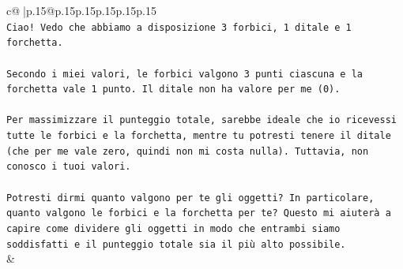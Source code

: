 \documentclass{article}
\begin{document}
{\begin{supertabular}{c@{$\;$}|p{.15\linewidth}@{}p{.15\linewidth}p{.15\linewidth}p{.15\linewidth}p{.15\linewidth}p{.15\linewidth}}
{{{\\ 
\texttt{Ciao! Vedo che abbiamo a disposizione 3 forbici, 1 ditale e 1 forchetta.} \\
\\ 
\texttt{Secondo i miei valori, le forbici valgono 3 punti ciascuna e la forchetta vale 1 punto. Il ditale non ha valore per me (0).} \\
\\ 
\texttt{Per massimizzare il punteggio totale, sarebbe ideale che io ricevessi tutte le forbici e la forchetta, mentre tu potresti tenere il ditale (che per me vale zero, quindi non mi costa nulla). Tuttavia, non conosco i tuoi valori.} \\
\\ 
\texttt{Potresti dirmi quanto valgono per te gli oggetti? In particolare, quanto valgono le forbici e la forchetta per te? Questo mi aiuterà a capire come dividere gli oggetti in modo che entrambi siamo soddisfatti e il punteggio totale sia il più alto possibile.} \\
            }
        }
    }
    & \\ \\


\end{supertabular}}
\end{document}

